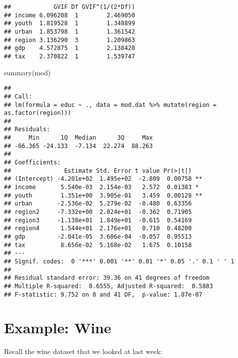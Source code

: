 \documentclass[
]{article}
\newenvironment{Shaded}{\begin{snugshade}}{\end{snugshade}}
\newcommand{\DecValTok}[1]{\textcolor[rgb]{0.00,0.00,0.81}{#1}}
\newcommand{\FunctionTok}[1]{\textcolor[rgb]{0.00,0.00,0.00}{#1}}
\newcommand{\NormalTok}[1]{#1}
\newcommand{\OtherTok}[1]{\textcolor[rgb]{0.56,0.35,0.01}{#1}}
\newcommand{\SpecialCharTok}[1]{\textcolor[rgb]{0.00,0.00,0.00}{#1}}
\newcommand{\StringTok}[1]{\textcolor[rgb]{0.31,0.60,0.02}{#1}}
\begin{document}
\begin{verbatim}
##            GVIF Df GVIF^(1/(2*Df))
## income 6.096208  1        2.469050
## youth  1.819528  1        1.348899
## urban  1.853798  1        1.361542
## region 3.136290  3        1.209863
## gdp    4.572875  1        2.138428
## tax    2.370822  1        1.539747
\end{verbatim}

\begin{Shaded}
\begin{Highlighting}[]
\FunctionTok{summary}\NormalTok{(mod)}
\end{Highlighting}
\end{Shaded}

\begin{verbatim}
## 
## Call:
## lm(formula = educ ~ ., data = mod.dat %>% mutate(region = as.factor(region)))
## 
## Residuals:
##     Min      1Q  Median      3Q     Max 
## -66.365 -24.133  -7.134  22.274  88.263 
## 
## Coefficients:
##               Estimate Std. Error t value Pr(>|t|)   
## (Intercept) -4.201e+02  1.495e+02  -2.809  0.00758 **
## income       5.540e-03  2.154e-03   2.572  0.01383 * 
## youth        1.351e+00  3.905e-01   3.459  0.00128 **
## urban       -2.536e-02  5.279e-02  -0.480  0.63356   
## region2     -7.332e+00  2.024e+01  -0.362  0.71905   
## region3     -1.138e+01  1.849e+01  -0.615  0.54169   
## region4      1.544e+01  2.176e+01   0.710  0.48200   
## gdp         -2.041e-05  3.606e-04  -0.057  0.95513   
## tax          8.656e-02  5.168e-02   1.675  0.10158   
## ---
## Signif. codes:  0 '***' 0.001 '**' 0.01 '*' 0.05 '.' 0.1 ' ' 1
## 
## Residual standard error: 39.36 on 41 degrees of freedom
## Multiple R-squared:  0.6555, Adjusted R-squared:  0.5883 
## F-statistic: 9.752 on 8 and 41 DF,  p-value: 1.87e-07
\end{verbatim}

\hypertarget{example-wine}{%
\section{Example: Wine}\label{example-wine}}

Recall the wine dataset that we looked at last week:

\begin{Shaded}
\end{Shaded}
\end{document}
